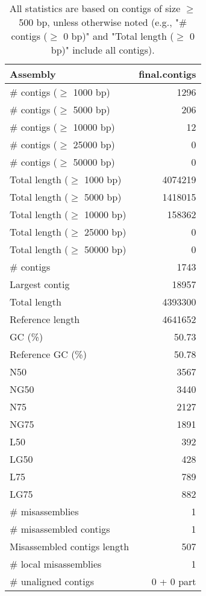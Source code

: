 \documentclass[12pt,a4paper]{article}
\begin{document}
\begin{table}[ht]
\begin{center}
\caption{All statistics are based on contigs of size $\geq$ 500 bp, unless otherwise noted (e.g., "\# contigs ($\geq$ 0 bp)" and "Total length ($\geq$ 0 bp)" include all contigs).}
\begin{tabular}{|l*{1}{|r}|}
\hline
Assembly & final.contigs \\ \hline
\# contigs ($\geq$ 1000 bp) & 1296 \\ \hline
\# contigs ($\geq$ 5000 bp) & 206 \\ \hline
\# contigs ($\geq$ 10000 bp) & 12 \\ \hline
\# contigs ($\geq$ 25000 bp) & 0 \\ \hline
\# contigs ($\geq$ 50000 bp) & 0 \\ \hline
Total length ($\geq$ 1000 bp) & 4074219 \\ \hline
Total length ($\geq$ 5000 bp) & 1418015 \\ \hline
Total length ($\geq$ 10000 bp) & 158362 \\ \hline
Total length ($\geq$ 25000 bp) & 0 \\ \hline
Total length ($\geq$ 50000 bp) & 0 \\ \hline
\# contigs & 1743 \\ \hline
Largest contig & 18957 \\ \hline
Total length & 4393300 \\ \hline
Reference length & 4641652 \\ \hline
GC (\%) & 50.73 \\ \hline
Reference GC (\%) & 50.78 \\ \hline
N50 & 3567 \\ \hline
NG50 & 3440 \\ \hline
N75 & 2127 \\ \hline
NG75 & 1891 \\ \hline
L50 & 392 \\ \hline
LG50 & 428 \\ \hline
L75 & 789 \\ \hline
LG75 & 882 \\ \hline
\# misassemblies & 1 \\ \hline
\# misassembled contigs & 1 \\ \hline
Misassembled contigs length & 507 \\ \hline
\# local misassemblies & 1 \\ \hline
\# unaligned contigs & 0 + 0 part \\ \hline

\end{tabular}
\end{center}
\end{table}
\end{document}

